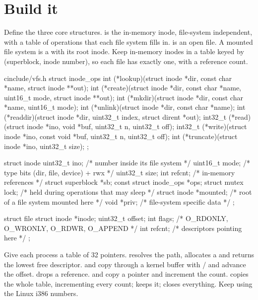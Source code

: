 \documentclass[11pt,a4paper]{article}
\begin{document}
\section{Build it}

Define the three core structures.  is the in-memory inode, file-system independent, with a table
of operations that each file system fills in.  is an open file. A mounted file system is a
 with its root inode. Keep in-memory inodes in a table keyed by (superblock, inode number), so
each file has exactly one, with a reference count.

\begin{lst}{c}{include/vfs.h}
struct inode_ops {
    int     (*lookup)(struct inode *dir, const char *name, struct inode **out);
    int     (*create)(struct inode *dir, const char *name, uint16_t mode, struct inode **out);
    int     (*mkdir)(struct inode *dir, const char *name, uint16_t mode);
    int     (*unlink)(struct inode *dir, const char *name);
    int     (*readdir)(struct inode *dir, uint32_t index, struct dirent *out);
    int32_t (*read)(struct inode *ino, void *buf, uint32_t n, uint32_t off);
    int32_t (*write)(struct inode *ino, const void *buf, uint32_t n, uint32_t off);
    int     (*truncate)(struct inode *ino, uint32_t size);
};

struct inode {
    uint32_t                ino;        /* number inside its file system        */
    uint16_t                mode;       /* type bits (dir, file, device) + rwx  */
    uint32_t                size;
    int                     refcnt;     /* in-memory references                 */
    struct superblock      *sb;
    const struct inode_ops *ops;
    struct mutex            lock;       /* held during operations that may sleep */
    struct inode           *mounted;    /* root of a file system mounted here   */
    void                   *priv;       /* file-system specific data            */
};

struct file {
    struct inode *inode;
    uint32_t      offset;
    int           flags;                /* O_RDONLY, O_WRONLY, O_RDWR, O_APPEND */
    int           refcnt;               /* descriptors pointing here            */
};
\end{lst}

Give each process a table of 32  pointers.  resolves the path, allocates a
 and returns the lowest free descriptor.  and  copy through a kernel buffer
with / and advance the offset.  drops a reference.  and
 copy a pointer and increment the count.  copies the whole table, incrementing every count;
 keeps it;  closes everything. Keep using the Linux i386 numbers.
\end{document}
